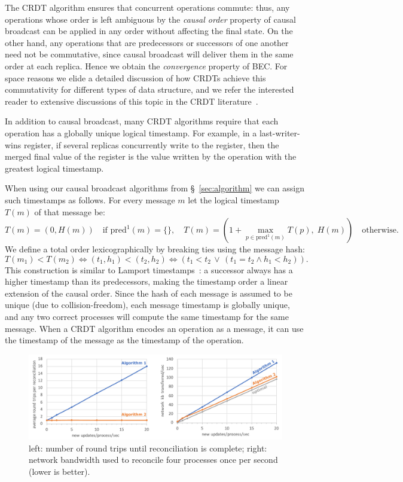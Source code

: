 \documentclass[a4paper,anonymous,USenglish]{lipics-v2019}
\begin{document}
The CRDT algorithm ensures that concurrent operations commute: thus, any operations whose order is left ambiguous by the \emph{causal order} property of causal broadcast can be applied in any order without affecting the final state.
On the other hand, any operations that are predecessors or successors of one another need not be commutative, since causal broadcast will deliver them in the same order at each replica.
Hence we obtain the \emph{convergence} property of BEC.
For space reasons we elide a detailed discussion of how CRDTs achieve this commutativity for different types of data structure, and we refer the interested reader to extensive discussions of this topic in the CRDT literature~\cite{Gomes:2017gy,Preguica:2018gi,Shapiro:2011wy,Weiss:2009ht}.

In addition to causal broadcast, many CRDT algorithms require that each operation has a globally unique logical timestamp.
For example, in a last-writer-wins register, if several replicas concurrently write to the register, then the merged final value of the register is the value written by the operation with the greatest logical timestamp.

When using our causal broadcast algorithms from \S~\ref{sec:algorithm} we can assign such timestamps as follows.
For every message $m$ let the logical timestamp $T(m)$ of that message be:
\[ T(m) = (0, H(m)) \quad\text{if } \mathrm{pred}^1(m) = \{\}, \quad
T(m) = \left(1 + \max_{p \in \mathrm{pred}^1(m)} T(p),\; H(m)\right) \quad\text{otherwise.} \]
We define a total order lexicographically by breaking ties using the message hash:
\[ T(m_1) < T(m_2) \iff (t_1, h_1) < (t_2, h_2) \iff (t_1 < t_2 \,\vee\, (t_1 = t_2 \wedge h_1 < h_2)). \]
This construction is similar to Lamport timestamps~\cite{Lamport:1978}: a successor always has a higher timestamp than its predecessors, making the timestamp order a linear extension of the causal order.
Since the hash of each message is assumed to be unique (due to collision-freedom), each message timestamp is globally unique, and any two correct processes will compute the same timestamp for the same message.
When a CRDT algorithm encodes an operation as a message, it can use the timestamp of the message as the timestamp of the operation.


\begin{figure}
  \includegraphics[width=\textwidth,keepaspectratio=true]{figs/evaluation.pdf}
  \caption{left: number of round trips until reconciliation is complete; right: network bandwidth used to reconcile four processes once per second (lower is better).}
  \label{fig:evaluation}
\end{figure}
\end{document}
